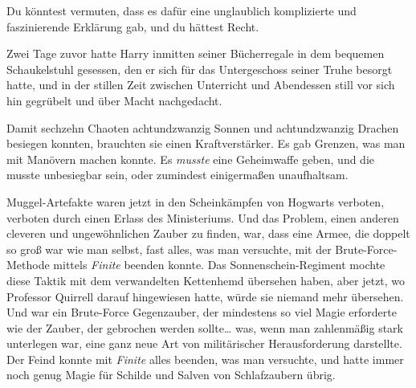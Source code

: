 Du könntest vermuten, dass es dafür eine unglaublich komplizierte und faszinierende Erklärung gab, und du hättest Recht.

Zwei Tage zuvor hatte Harry inmitten seiner Bücherregale in dem bequemen Schaukelstuhl gesessen, den er sich für das Untergeschoss seiner Truhe besorgt hatte, und in der stillen Zeit zwischen Unterricht und Abendessen still vor sich hin gegrübelt und über Macht nachgedacht.

Damit sechzehn Chaoten achtundzwanzig Sonnen und achtundzwanzig Drachen besiegen konnten, brauchten sie einen Kraftverstärker. Es gab Grenzen, was man mit Manövern machen konnte. Es \emph{musste} eine Geheimwaffe geben, und die musste unbesiegbar sein, oder zumindest einigermaßen unaufhaltsam.

Muggel-Artefakte waren jetzt in den Scheinkämpfen von Hogwarts verboten, verboten durch einen Erlass des Ministeriums. Und das Problem, einen anderen cleveren und ungewöhnlichen Zauber zu finden, war, dass eine Armee, die doppelt so groß war wie man selbst, fast alles, was man versuchte, mit der Brute-Force-Methode mittels \emph{Finite} beenden konnte. Das Sonnenschein-Regiment mochte diese Taktik mit dem verwandelten Kettenhemd übersehen haben, aber jetzt, wo Professor Quirrell darauf hingewiesen hatte, würde sie niemand mehr übersehen. Und  war ein Brute-Force Gegenzauber, der mindestens so viel Magie erforderte wie der Zauber, der gebrochen werden sollte… was, wenn man zahlenmäßig stark unterlegen war, eine ganz neue Art von militärischer Herausforderung darstellte. Der Feind konnte mit \emph{Finite} alles beenden, was man versuchte, und hatte immer noch genug Magie für Schilde und Salven von Schlafzaubern übrig.

